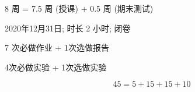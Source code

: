 
\begin{frame}{}
  \begin{center}
    8 周 = 7.5 周 (授课) + 0.5 周 (期末测试)
  \end{center}

  \pause
\end{frame}

\begin{frame}{}
  \begin{center}
     2020年12月31日; 时长 2 小时; 闭卷
    \vspace{1.00cm}

     7 次必做作业 + 1次选做报告 

    \vspace{1.00cm}
     4次必做实验 + 1次选做实验 
  \end{center}
\end{frame}

\begin{frame}{}
  \[
    45 = 5 + 15 + 15 + 10
  \]
\end{frame}

\begin{frame}{}

  \vspace{0.50cm}
  \begin{center}
  \end{center}
\end{frame}
